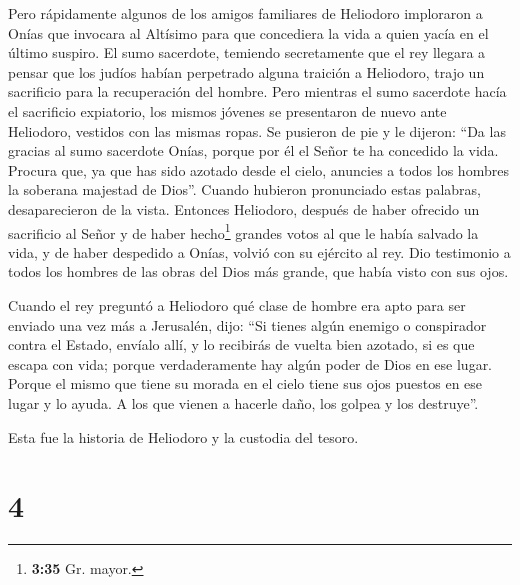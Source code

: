  Pero rápidamente algunos de los amigos familiares de
Heliodoro imploraron a Onías que invocara al Altísimo para que
concediera la vida a quien yacía en el último suspiro. 
El sumo sacerdote, temiendo secretamente que el rey llegara a pensar que
los judíos habían perpetrado alguna traición a Heliodoro, trajo un
sacrificio para la recuperación del hombre.  Pero
mientras el sumo sacerdote hacía el sacrificio expiatorio, los mismos
jóvenes se presentaron de nuevo ante Heliodoro, vestidos con las mismas
ropas. Se pusieron de pie y le dijeron: ``Da las gracias al sumo
sacerdote Onías, porque por él el Señor te ha concedido la vida.
 Procura que, ya que has sido azotado desde el cielo,
anuncies a todos los hombres la soberana majestad de Dios''. Cuando
hubieron pronunciado estas palabras, desaparecieron de la vista.
 Entonces Heliodoro, después de haber ofrecido un
sacrificio al Señor y de haber hecho\footnote{\textbf{3:35} Gr. mayor.}
grandes votos al que le había salvado la vida, y de haber despedido a
Onías, volvió con su ejército al rey.  Dio testimonio a
todos los hombres de las obras del Dios más grande, que había visto con
sus ojos.

 Cuando el rey preguntó a Heliodoro qué clase de hombre
era apto para ser enviado una vez más a Jerusalén, dijo: 
``Si tienes algún enemigo o conspirador contra el Estado, envíalo allí,
y lo recibirás de vuelta bien azotado, si es que escapa con vida; porque
verdaderamente hay algún poder de Dios en ese lugar. 
Porque el mismo que tiene su morada en el cielo tiene sus ojos puestos
en ese lugar y lo ayuda. A los que vienen a hacerle daño, los golpea y
los destruye''.

 Esta fue la historia de Heliodoro y la custodia del
tesoro.

\hypertarget{section-3}{%
\section{4}\label{section-3}}

